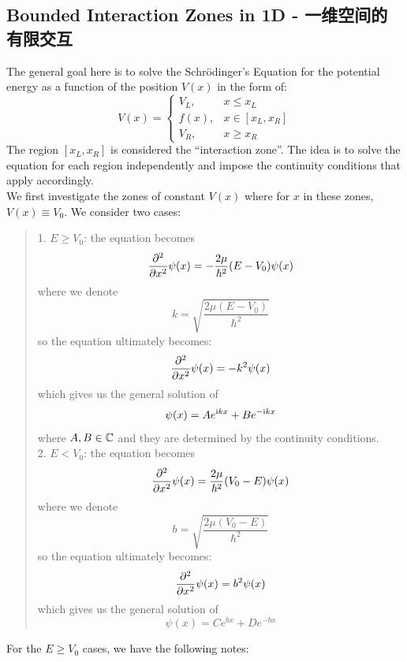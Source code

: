 \subsection{Bounded Interaction Zones in 1D - 一维空间的有限交互}
The general goal here is to solve the Schr\"odinger's Equation for the potential energy as a function of the position $V(x)$ in the form of:
$$V(x) = \begin{cases}
    V_L, & x \le x_L \\
    f(x), & x \in [x_L, x_R] \\
    V_R, & x \ge x_R
\end{cases}$$
The region $[x_L, x_R]$ is considered the ``interaction zone''. The idea is to solve the equation for each region independently and impose the continuity conditions that apply accordingly. \\
We first investigate the zones of constant $V(x)$ where for $x$ in these zones, $V(x) \equiv V_0$. We consider two cases:
\begin{quote}
    1. $E \ge V_0$: the equation becomes
    $$\pdv[2]{x} \psi(x) = -\frac{2\mu}{\hbar^2}(E - V_0)\psi(x)$$
    where we denote
    $$k = \sqrt{\frac{2\mu(E-V_0)}{\hbar^2}}$$
    so the equation ultimately becomes:
    $$\pdv[2]{x} \psi(x) = -k^2\psi(x)$$
    which gives us the general solution of
    $$\psi(x) = Ae^{\mathrm{i} k x} + Be^{-\mathrm{i} k x}$$
    where $A, B \in \mathbb{C}$ and they are determined by the continuity conditions. \\
    2. $E < V_0$: the equation becomes
    $$\pdv[2]{x} \psi(x) = \frac{2\mu}{\hbar^2}(V_0 - E)\psi(x)$$
    where we denote
    $$b = \sqrt{\frac{2\mu(V_0 - E)}{\hbar^2}}$$
    so the equation ultimately becomes:
    $$\pdv[2]{x} \psi(x) = b^2\psi(x)$$
    which gives us the general solution of
    $$\psi(x) = Ce^{b x} + De^{- b x}$$
\end{quote}
For the $E \ge V_0$ cases, we have the following notes:
